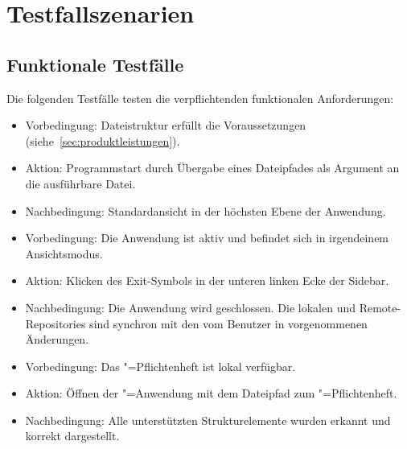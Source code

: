 \clearpage

\section{Testfallszenarien}
\label{sec:testfallszenarien}

\subsection{Funktionale Testfälle}
\label{subsec:funktionale-testfaelle}

Die folgenden Testfälle testen die verpflichtenden funktionalen Anforderungen:

\begin{itemize}
  \item Vorbedingung: Dateistruktur erfüllt die Voraussetzungen (siehe~\ref{sec:produktleistungen}).
  \item Aktion: Programmstart durch Übergabe eines Dateipfades als Argument an die ausführbare Datei.
  \item Nachbedingung: Standardansicht in der höchsten Ebene der Anwendung.
\end{itemize}

\begin{itemize}
  \item Vorbedingung: Die Anwendung ist aktiv und befindet sich in irgendeinem Ansichtsmodus.
  \item Aktion: Klicken des Exit-Symbols in der unteren linken Ecke der Sidebar.
  \item Nachbedingung: Die Anwendung wird geschlossen.
  Die lokalen und Remote-Repositories sind synchron mit den vom Benutzer in \texla{} vorgenommenen Änderungen.
\end{itemize}

\begin{itemize}
  \item Vorbedingung: Das \texla"=Pflichtenheft ist lokal verfügbar.
  \item Aktion: Öffnen der \texla"=Anwendung mit dem Dateipfad zum \texla"=Pflichtenheft.
  \item Nachbedingung: Alle unterstützten Strukturelemente wurden erkannt und korrekt dargestellt.
\end{itemize}

\clearpage

